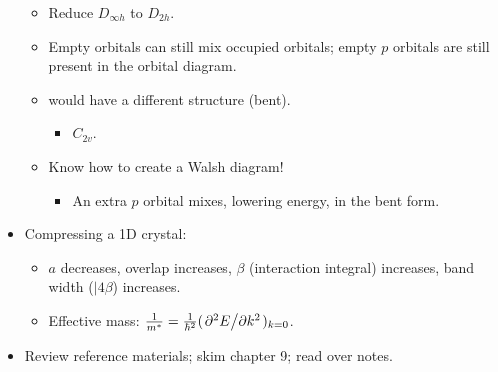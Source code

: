 \documentclass[../notes.tex]{subfiles}
\begin{document}
\begin{itemize}
    \begin{itemize}
        \item Reduce $D_{\infty h}$ to $D_{2h}$.
        \item Empty orbitals can still mix occupied orbitals; empty $p$ orbitals are still present in the orbital diagram.
        \item {} would have a different structure (bent).
        \begin{itemize}
            \item $C_{2v}$.
        \end{itemize}
        \item Know how to create a Walsh diagram!
        \begin{itemize}
            \item An extra $p$ orbital mixes, lowering energy, in the bent form.
        \end{itemize}
    \end{itemize}
    \item Compressing a 1D crystal:
    \begin{itemize}
        \item $a$ decreases, overlap increases, $\beta$ (interaction integral) increases, band width ($|4\beta$) increases.
        \item Effective mass: $\frac{1}{m^*}=\frac{1}{\hbar^2}(\pdv*[2]{E}{k})_{k=0}$.
    \end{itemize}
    \item Review reference materials; skim chapter 9; read over notes.
\end{itemize}
\end{document}
